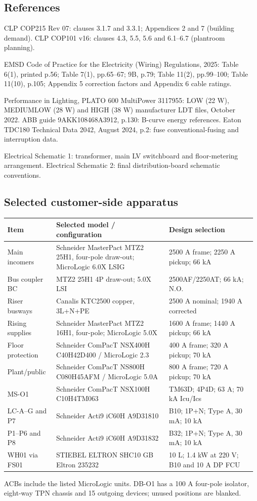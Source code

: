 \subsection*{References}
CLP COP215 Rev 07: clauses 3.1.7 and 3.3.1; Appendices 2 and 7 (building demand). CLP COP101 v16: clauses 4.3, 5.5, 5.6 and 6.1--6.7 (plantroom planning).

EMSD Code of Practice for the Electricity (Wiring) Regulations, 2025: Table 6(1), printed p.56; Table 7(1), pp.65--67; 9B, p.79; Table 11(2), pp.99--100; Table 11(10), p.105; Appendix 5 correction factors and Appendix 6 cable ratings.

Performance in Lighting, PLATO 600 MultiPower 3117955: LOW (22 W), MEDIUMLOW (28 W) and HIGH (38 W) manufacturer LDT files, October 2022. ABB guide 9AKK108468A3912, p.130: B-curve energy references. Eaton TDC180 Technical Data 2042, August 2024, p.2: fuse conventional-fusing and interruption data. 

\noindent Electrical Schematic 1: transformer, main LV switchboard and floor-metering arrangement. Electrical Schematic 2: final distribution-board schematic conventions.


\clearpage
\subsection*{Selected customer-side apparatus}
\begingroup\small\renewcommand{\arraystretch}{1.0}
\begin{longtable}{p{.19\linewidth}p{.42\linewidth}p{.31\linewidth}}\toprule
Item & Selected model / configuration & Design selection\\\midrule\endhead
Main incomers & Schneider MasterPact MTZ2 25H1, four-pole draw-out; MicroLogic 6.0X LSIG & 2500 A frame; 2250 A pickup; 66 kA\\
Bus coupler BC & MTZ2 25H1 4P draw-out; 5.0X LSI & 2500AF/2250AT; 66 kA; N.O.\\
Riser busways & Canalis KTC2500 copper, 3L+N+PE & 2500 A nominal; 1940 A corrected\\
Rising supplies & Schneider MasterPact MTZ2 16H1, four-pole; MicroLogic 5.0X & 1600 A frame; 1440 A pickup; 66 kA\\
Floor protection & Schneider ComPacT NSX400H C40H42D400 / MicroLogic 2.3 & 400 A frame; 320 A pickup; 70 kA\\
Plant/public & Schneider ComPacT NS800H C080H45AFM / MicroLogic 5.0A & 800 A frame; 720 A pickup; 70 kA\\
MS-O1 & Schneider ComPacT NSX100H C10H4TM063 & TM63D; 4P4D; 63 A; 70 kA Icu/Ics\\
LC-A--G and P7 & Schneider Acti9 iC60H A9D31810 & B10; 1P+N; Type A, 30 mA; 10 kA\\
P1--P6 and P8 & Schneider Acti9 iC60H A9D31832 & B32; 1P+N; Type A, 30 mA; 10 kA\\
WH01 via FS01 & STIEBEL ELTRON SHC10 GB Eltron 235232 & 10 L; 1.4 kW at 220 V; B10 and 10 A DP FCU\\
\bottomrule\end{longtable}
\endgroup
ACBs include the listed MicroLogic units. DB-O1 has a 100 A four-pole isolator, eight-way TPN chassis and 15 outgoing devices; unused positions are blanked.

